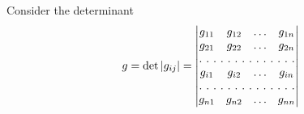 Consider the determinant 
\begin{equation}
g = \det \left| \gij \right| =
\begin{vmatrix}
g_{11} & g_{12}  & \hdots & g_{1n}  \\
g_{21} & g_{22}  & \hdots & g_{2n}  \\
\hdotsfor[2]{4}\\
g_{i1} & g_{i2}  & \hdots & g_{in}  \\
\hdotsfor[2]{4}\\
g_{n1} & g_{n2}  & \hdots & g_{nn}  \\
\end{vmatrix}
\end{equation}







